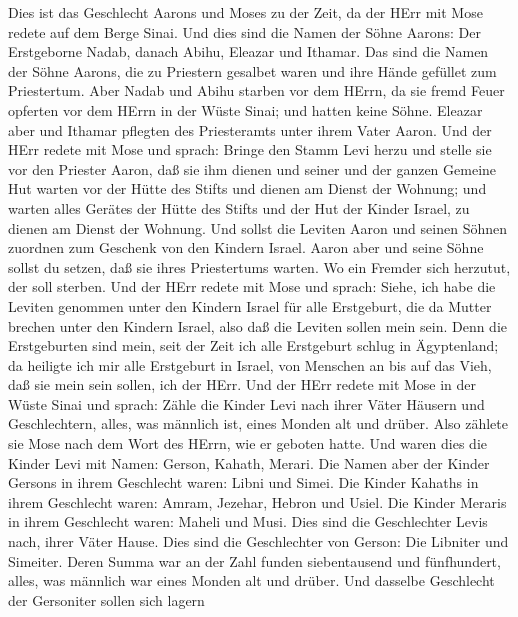  Dies ist das Geschlecht Aarons und Moses zu der Zeit, da
der HErr mit Mose redete auf dem Berge Sinai.  Und dies sind
die Namen der Söhne Aarons: Der Erstgeborne Nadab, danach Abihu, Eleazar
und Ithamar.  Das sind die Namen der Söhne Aarons, die zu
Priestern gesalbet waren und ihre Hände gefüllet zum Priestertum.
 Aber Nadab und Abihu starben vor dem HErrn, da sie fremd
Feuer opferten vor dem HErrn in der Wüste Sinai; und hatten keine Söhne.
Eleazar aber und Ithamar pflegten des Priesteramts unter ihrem Vater
Aaron.  Und der HErr redete mit Mose und sprach:
 Bringe den Stamm Levi herzu und stelle sie vor den Priester
Aaron, daß sie ihm dienen  und seiner und der ganzen Gemeine
Hut warten vor der Hütte des Stifts und dienen am Dienst der Wohnung;
 und warten alles Gerätes der Hütte des Stifts und der Hut
der Kinder Israel, zu dienen am Dienst der Wohnung.  Und
sollst die Leviten Aaron und seinen Söhnen zuordnen zum Geschenk von den
Kindern Israel.  Aaron aber und seine Söhne sollst du
setzen, daß sie ihres Priestertums warten. Wo ein Fremder sich herzutut,
der soll sterben.  Und der HErr redete mit Mose und sprach:
 Siehe, ich habe die Leviten genommen unter den Kindern
Israel für alle Erstgeburt, die da Mutter brechen unter den Kindern
Israel, also daß die Leviten sollen mein sein.  Denn die
Erstgeburten sind mein, seit der Zeit ich alle Erstgeburt schlug in
Ägyptenland; da heiligte ich mir alle Erstgeburt in Israel, von Menschen
an bis auf das Vieh, daß sie mein sein sollen, ich der HErr.
 Und der HErr redete mit Mose in der Wüste Sinai und
sprach:  Zähle die Kinder Levi nach ihrer Väter Häusern und
Geschlechtern, alles, was männlich ist, eines Monden alt und drüber.
 Also zählete sie Mose nach dem Wort des HErrn, wie er
geboten hatte.  Und waren dies die Kinder Levi mit Namen:
Gerson, Kahath, Merari.  Die Namen aber der Kinder Gersons
in ihrem Geschlecht waren: Libni und Simei.  Die Kinder
Kahaths in ihrem Geschlecht waren: Amram, Jezehar, Hebron und Usiel.
 Die Kinder Meraris in ihrem Geschlecht waren: Maheli und
Musi. Dies sind die Geschlechter Levis nach, ihrer Väter Hause.
 Dies sind die Geschlechter von Gerson: Die Libniter und
Simeiter.  Deren Summa war an der Zahl funden siebentausend
und fünfhundert, alles, was männlich war eines Monden alt und drüber.
 Und dasselbe Geschlecht der Gersoniter sollen sich lagern
